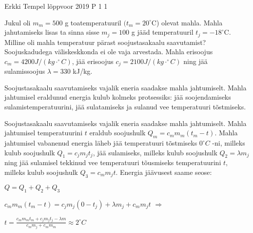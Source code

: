 {Erkki Tempel} %
{lõppvoor} %
{2019} %
{P 1} %
{1} %
{

\ifStatement
Jukul oli $m_m = 500$ g toatemperatuuril $(t_m = 20^{\circ}$C) olevat mahla. Mahla jahutamiseks lisas ta sinna sisse $m_j = 100$ g jääd temperatuuril $t_j = -18^{\circ}$C. Milline oli mahla temperatuur pärast soojustasakaalu saavutamist? Soojuskadudega väliskeskkonda ei ole vaja arvestada. Mahla erisoojus $c_m = 4200 J/(kg \cdot ^{\circ}C)$, jää erisoojus $c_j = 2100 J/(kg \cdot ^{\circ}C)$ ning jää sulamissoojus $\lambda = 330$ kJ/kg.
\fi

\ifHint
Soojustasakaalu saavutamiseks vajalik eneria saadakse mahla jahtumiselt. Mahla jahtumisel eraldunud energia kulub kolmeks protsessiks: jää soojendamiseks sulamistemperatuurini, jää sulatamiseks ja sulanud vee temperatuuri tõstmiseks.
\fi

\ifSolution
Soojustasakaalu saavutamiseks vajalik eneria saadakse mahla jahtumiselt. Mahla jahtumisel temperatuurini $t$ eraldub soojushulk $Q_m = c_m m_m (t_m - t)$. Mahla jahtumisel vabanenud energia läheb jää temperatuuri tõstmiseks $0 ^{\circ}C$ -ni, milleks kulub soojushulk $Q_1 = c_j m_j t_j$, jää sulamiseks, milleks kulub soojushulk $Q_2 = \lambda m_j$ ning jää sulamisel tekkinud vee temperatuuri tõusmiseks temperatuurini $t$, milleks kulub soojushulk $Q_3 = c_m m_j t$. Energia jäävusest saame seose:
\begin{center}
$Q = Q_1 + Q_2 + Q_3$
\end{center}
\begin{center}
$c_m m_m(t_m - t) = c_j m_j(0 - t_j) + \lambda m_j + c_m m_j t$ $\Rightarrow$
\end{center}
\begin{center}
$t = \frac{c_m m_m t_m + c_j m_j t_j - \lambda m}{c_m m_j + c_m m_m} \approx 2 ^{\circ}C$
\end{center}
\fi
}